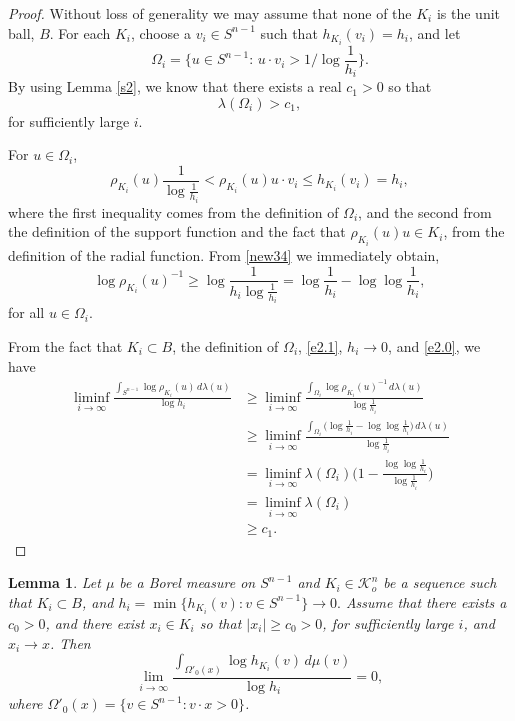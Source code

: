 \documentclass{cpamart1}     %
\newtheorem{lemm}[theo]{Lemma}
\theoremstyle{definition}
\theoremstyle{remark}
\newcommand{\sn}{S^{n-1}}
\begin{document}
\begin{proof}
Without loss of generality we may assume that none of the $K_i$ is the unit ball, $B$.
For each $K_i$, choose a $v_i\in S^{n-1}$ such that $h_{K_i}(v_i)=h_i$, and let
\[
\Omega_i=\{u\in S^{n-1}:\,u\cdot v_i>1/\log{\scriptstyle\frac1{h_i}}\}.
\]
By using Lemma \ref{s2}, we know that there exists a real $c_1>0$ so that
\begin{equation}\label{e2.0}
\lambda(\Omega_i) > c_1,
\end{equation}
for sufficiently large $i$.


For $u\in \Omega_i$,
\begin{equation}\label{new34}
\rho_{K_i}(u)\frac{1}{\log\frac{1}{h_i}}<\rho_{K_i}(u)u\cdot v_i\leq h_{K_i}(v_i)=h_i,
\end{equation}
where the first inequality comes from the definition of $\Omega_i$, and the second
from the definition of the support function and the fact that $\rho_{K_i}(u)u\in K_i$,
from the definition of the radial function.
From \eqref{new34} we immediately obtain,
\begin{equation}\label{e2.1}
\log{\rho_{K_i}(u)^{-1}}\geq \log\frac1{h_i\log\frac1{h_i}}
=\log\frac1{h_i}-\log\log \frac1{h_i},
\end{equation}
for all $u\in \Omega_i$.

From the fact that $K_i\subset B$, the definition of $\Omega_i$, \eqref{e2.1},
$h_i \to 0$, and \eqref{e2.0}, we have
\begin{align*}
\liminf_{i\to \infty} \frac{\int_{S^{n-1}}\log \rho_{K_i}(u)\,
 d\lambda(u)}{\log h_i}
&\ge
\liminf_{i\to \infty} \frac{\int_{\Omega_i}
\log{\rho_{K_i}(u)^{-1}}\, d\lambda(u)}{\log \frac1{h_i}}\\
&\geq \liminf_{i\to \infty}\frac{\int_{\Omega_i}
  \big(\log \frac{1}{h_i}-\log\log\frac{1}{h_i}\big) \,
  d\lambda(u)}{\log\frac{1}{h_i}}\\
&= \liminf_{i\to \infty}\lambda(\Omega_i)
\Big(1-\frac{\log\log \frac{1}{h_i}}{\log \frac{1}{h_i}}\Big)\\
&=\liminf_{i\to\infty}\lambda(\Omega_i) \\
&\ge c_1.
\end{align*}
\end{proof}






\begin{lemm}\label{e3}
Let $\mu$ be a Borel measure on $\sn$
and $K_i\in \mathcal{K}_o^n$ be a sequence
such that $K_i\subset B$, and
$h_i=\min\{h_{K_i}(v):v\in S^{n-1}\}\rightarrow 0.$
Assume that there exists a $c_0>0$, and there exist $x_i\in K_i$
so that $|x_i|\ge c_0 >0$, for sufficiently large $i$, and $x_i\rightarrow x$.
Then
\begin{equation*}
\lim_{i\rightarrow \infty}\frac{\int_{\Omega'_0(x)}\log h_{K_i}(v) \, d\mu(v)}{\log h_i}=0,
\end{equation*}
where $\Omega'_0(x)=\{v\in S^{n-1}:v\cdot x>0\}$.
\end{lemm}
\end{document}
